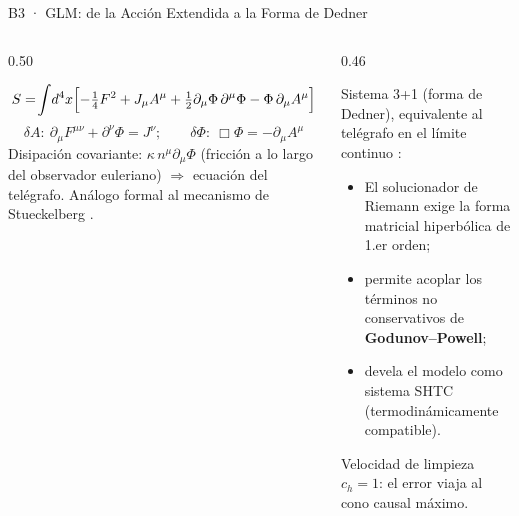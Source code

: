 \documentclass[aspectratio=169,9pt]{beamer}
\begin{document}
\begin{frame}{B3 · GLM: de la Acci\'on Extendida a la Forma de Dedner}
\begin{columns}[T]
\begin{column}{0.50\textwidth}
  \begin{tcolorbox}[EQ={Acci\'on extendida (sector el\'ectrico)}]
    \scriptsize
    \[
      S=\!\int\! d^4x\Bigl[-\tfrac14F^2+J_\mu A^\mu
        +\tfrac12\partial_\mu\Phi\,\partial^\mu\Phi
        -\Phi\,\partial_\mu A^\mu\Bigr]
    \]
    \[
      \delta A:\ \partial_\mu F^{\mu\nu}+\partial^\nu\Phi=J^\nu;
      \qquad
      \delta\Phi:\ \Box\Phi=-\partial_\mu A^\mu
    \]
    Disipaci\'on covariante: $\kappa\,n^\mu\partial_\mu\Phi$
    (fricci\'on a lo largo del observador euleriano)
    $\Rightarrow$ ecuaci\'on del tel\'egrafo. An\'alogo formal al
    mecanismo de Stueckelberg \citep{lee2004}.
  \end{tcolorbox}
\end{column}
\begin{column}{0.46\textwidth}
  \begin{tcolorbox}[RES={Por qu\'e el c\'odigo integra el 1.er orden}]
    \scriptsize
    Sistema 3+1 (forma de Dedner), equivalente al tel\'egrafo en el
    l\'imite continuo \citep{Dedner-2002}:
    \begin{itemize}\setlength\itemsep{2pt}
      \item El solucionador de Riemann exige la forma matricial
            hiperb\'olica de 1.er orden;
      \item permite acoplar los t\'erminos no conservativos de
            \textbf{Godunov--Powell};
      \item devela el modelo como sistema SHTC
            (termodin\'amicamente compatible).
    \end{itemize}
    Velocidad de limpieza $c_h=1$: el error viaja al cono causal m\'aximo.
  \end{tcolorbox}
\end{column}
\end{columns}
\end{frame}
\end{document}
